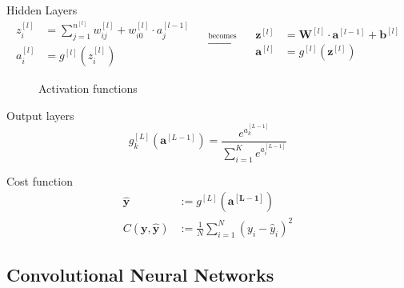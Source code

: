 \begin{frame}
  \begin{block}{Hidden Layers}
    \begin{equation*}
      \begin{aligned}
        z_i^{[l]} &= \sum_{j = 1}^{n^{[l]}} w_{ij}^{[l]} + w_{i0}^{[l]} \cdot a_j^{[l - 1]} \\
        a_i^{[l]} &= g^{[l]}(z_i^{[l]})
      \end{aligned}
      \quad
      \xrightarrow{\text{becomes}}
      \quad
      \begin{aligned}
        \bm{z}^{[l]} &= \bm{W}^{[l]} \cdot \bm{a}^{[l - 1]} + \bm{b}^{[l]} \\
        \bm{a}^{[l]} &= g^{[l]}(\bm{z}^{[l]})
      \end{aligned}
    \end{equation*}
  
  \end{block}
  \begin{figure}
    \centering
    
  
    \caption[Activation functions]{
      Activation functions
    }
  \end{figure}
\end{frame}

\begin{frame}
  \begin{block}{Output layers}
    \[
      g_k^{[L]}(\bm{a}^{[L - 1]}) = \frac{e^{a_k^{[L - 1]}}}{\sum_{i = 1}^K e^{a_i^{[L - 1]}}}
    \]
  \end{block}
  
  \begin{block}{Cost function}
    \begin{align*}
      \hat{\bm{y}} &:= g^{[L]}(\bm{a^{[L - 1]}}) \\
      C(\bm{y}, \hat{\bm{y}}) &:= \frac{1}{N} \sum_{i = 1}^N (y_i - \hat{y}_i)^2
    \end{align*}
  \end{block}
\end{frame}

\subsection{Convolutional Neural Networks}

\begin{frame}{\insertsubsec}
  
\end{frame}
